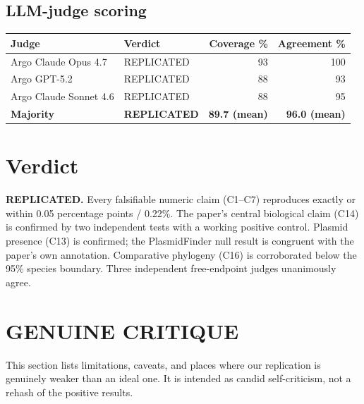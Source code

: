 \documentclass[11pt]{article}
\begin{document}
\subsection{LLM-judge scoring}
\begin{center}
\begin{tabular}{llrr}
\toprule
Judge & Verdict & Coverage \% & Agreement \% \\
\midrule
Argo Claude Opus 4.7 & REPLICATED & 93 & 100 \\
Argo GPT-5.2         & REPLICATED & 88 & 93 \\
Argo Claude Sonnet 4.6 & REPLICATED & 88 & 95 \\
\midrule
\textbf{Majority}    & \textbf{REPLICATED} & \textbf{89.7 (mean)} & \textbf{96.0 (mean)} \\
\bottomrule
\end{tabular}
\end{center}

\section{Verdict}
\textbf{REPLICATED.} Every falsifiable numeric claim (C1--C7) reproduces exactly or within 0.05 percentage points / 0.22\%. The paper's central biological claim (C14) is confirmed by two independent tests with a working positive control. Plasmid presence (C13) is confirmed; the PlasmidFinder null result is congruent with the paper's own annotation. Comparative phylogeny (C16) is corroborated below the 95\% species boundary. Three independent free-endpoint judges unanimously agree.

\section{GENUINE CRITIQUE}
\label{sec:critique}

This section lists limitations, caveats, and places where our replication is genuinely weaker than an ideal one. It is intended as candid self-criticism, not a rehash of the positive results.
\end{document}
